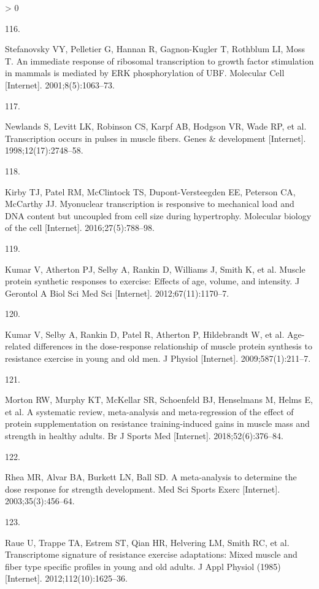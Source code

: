 \documentclass[twoside,10pt]{gihclass} %
\newlength{\cslhangindent}
\newlength{\csllabelwidth}
\newenvironment{CSLReferences}[3] %
 {%
  \setlength{\parindent}{0pt}
  \ifodd #1 \everypar{\setlength{\hangindent}{\cslhangindent}}\ignorespaces\fi
  \ifnum #2 > 0
  \setlength{\parskip}{#2\baselineskip}
  \fi
 }%
 {}
\newcommand{\CSLLeftMargin}[1]{\parbox[t]{\maxof{\widthof{#1}}{\csllabelwidth}}{#1}}
\newcommand{\CSLRightInline}[1]{\parbox[t]{\linewidth}{#1}}
\begin{document}
\begin{CSLReferences}{0}{0}
\leavevmode\hypertarget{ref-RN2604}{}%
\CSLLeftMargin{116. }
\CSLRightInline{Stefanovsky VY, Pelletier G, Hannan R, Gagnon-Kugler T, Rothblum LI, Moss T. An immediate response of ribosomal transcription to growth factor stimulation in mammals is mediated by ERK phosphorylation of UBF. Molecular Cell {[}Internet{]}. 2001;8(5):1063--73. }

\leavevmode\hypertarget{ref-RN2618}{}%
\CSLLeftMargin{117. }
\CSLRightInline{Newlands S, Levitt LK, Robinson CS, Karpf AB, Hodgson VR, Wade RP, et al. Transcription occurs in pulses in muscle fibers. Genes \& development {[}Internet{]}. 1998;12(17):2748--58. }

\leavevmode\hypertarget{ref-RN2616}{}%
\CSLLeftMargin{118. }
\CSLRightInline{Kirby TJ, Patel RM, McClintock TS, Dupont-Versteegden EE, Peterson CA, McCarthy JJ. Myonuclear transcription is responsive to mechanical load and DNA content but uncoupled from cell size during hypertrophy. Molecular biology of the cell {[}Internet{]}. 2016;27(5):788--98. }

\leavevmode\hypertarget{ref-RN2716}{}%
\CSLLeftMargin{119. }
\CSLRightInline{Kumar V, Atherton PJ, Selby A, Rankin D, Williams J, Smith K, et al. Muscle protein synthetic responses to exercise: Effects of age, volume, and intensity. J Gerontol A Biol Sci Med Sci {[}Internet{]}. 2012;67(11):1170--7. }

\leavevmode\hypertarget{ref-RN2720}{}%
\CSLLeftMargin{120. }
\CSLRightInline{Kumar V, Selby A, Rankin D, Patel R, Atherton P, Hildebrandt W, et al. Age-related differences in the dose-response relationship of muscle protein synthesis to resistance exercise in young and old men. J Physiol {[}Internet{]}. 2009;587(1):211--7. }

\leavevmode\hypertarget{ref-RN2199}{}%
\CSLLeftMargin{121. }
\CSLRightInline{Morton RW, Murphy KT, McKellar SR, Schoenfeld BJ, Henselmans M, Helms E, et al. A systematic review, meta-analysis and meta-regression of the effect of protein supplementation on resistance training-induced gains in muscle mass and strength in healthy adults. Br J Sports Med {[}Internet{]}. 2018;52(6):376--84. }

\leavevmode\hypertarget{ref-RN1486}{}%
\CSLLeftMargin{122. }
\CSLRightInline{Rhea MR, Alvar BA, Burkett LN, Ball SD. A meta-analysis to determine the dose response for strength development. Med Sci Sports Exerc {[}Internet{]}. 2003;35(3):456--64. }

\leavevmode\hypertarget{ref-RN774}{}%
\CSLLeftMargin{123. }
\CSLRightInline{Raue U, Trappe TA, Estrem ST, Qian HR, Helvering LM, Smith RC, et al. Transcriptome signature of resistance exercise adaptations: Mixed muscle and fiber type specific profiles in young and old adults. J Appl Physiol (1985) {[}Internet{]}. 2012;112(10):1625--36. }


\end{CSLReferences}
\end{document}
